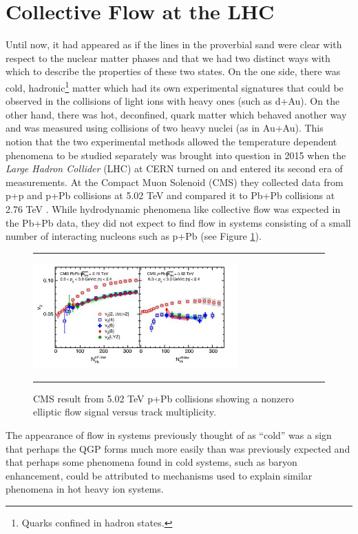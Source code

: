 \section{Collective Flow at the LHC}
Until now, it had appeared as if the lines in the proverbial sand were clear with respect to the nuclear matter phases and that we had two distinct ways with which to describe the properties of these two states. On the one side, there was cold, hadronic\footnote{Quarks confined in hadron states.} matter which had its own experimental signatures that could be observed in the collisions of light ions with heavy ones (such as d+Au). On the other hand, there was hot, deconfined, quark matter which behaved another way and was measured using collisions of two heavy nuclei (as in Au+Au). This notion that the two experimental methods allowed the temperature dependent phenomena to be studied separately was brought into question in 2015 when the \textit{Large Hadron Collider} (LHC) at CERN turned on and entered its second era of measurements. At the Compact Muon Solenoid (CMS) they collected data from p+p and p+Pb collisions at 5.02 TeV and compared it to Pb+Pb collisions at 2.76 TeV \citep{Khachatryan:2015waa}. While hydrodynamic phenomena like collective flow was expected in the Pb+Pb data, they did not expect to find flow in systems consisting of a small number of interacting nucleons such as p+Pb (see Figure \ref{fig:pPbflow}).
 
\begin{figure}[htbp!]
  \centering    \rule{35em}{0.5pt}
    \includegraphics[width=0.7\textwidth]{prevplots/pPbflowLHC.JPG}

  \caption[Elliptic Flow in p+Pb at the LHC]{CMS result from 5.02 TeV p+Pb collisions showing a nonzero elliptic flow signal versus track multiplicity. \citep{Khachatryan:2015waa}}
  \label{fig:pPbflow}    \rule{35em}{0.5pt}
\end{figure} 

The appearance of flow in systems previously thought of as ``cold'' was a sign that perhaps the QGP forms much more easily than was previously expected and that perhaps some phenomena found in cold systems, such as baryon enhancement, could be attributed to mechanisms used to explain similar phenomena in hot heavy ion systems.

